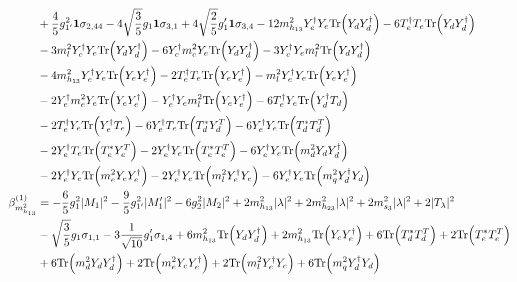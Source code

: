 {\begin{align}
 &+\frac{4}{5} g_{1'}^{2} {\bf 1} \sigma_{2,44} -4 \sqrt{\frac{3}{5}} g_1 {\bf 1} \sigma_{3,1} +4 \sqrt{\frac{2}{5}} g_1' {\bf 1} \sigma_{3,4} -12 m_{h_{13}}^2 {Y_{e}^{\dagger}  Y_e} \mbox{Tr}\Big({Y_d  Y_{d}^{\dagger}}\Big) -6 {T_{e}^{\dagger}  T_e} \mbox{Tr}\Big({Y_d  Y_{d}^{\dagger}}\Big) \nonumber \\ 
 &-3 {m_l^2  Y_{e}^{\dagger}  Y_e} \mbox{Tr}\Big({Y_d  Y_{d}^{\dagger}}\Big) -6 {Y_{e}^{\dagger}  m_e^2  Y_e} \mbox{Tr}\Big({Y_d  Y_{d}^{\dagger}}\Big) -3 {Y_{e}^{\dagger}  Y_e  m_l^2} \mbox{Tr}\Big({Y_d  Y_{d}^{\dagger}}\Big) \nonumber \\ 
 &-4 m_{h_{13}}^2 {Y_{e}^{\dagger}  Y_e} \mbox{Tr}\Big({Y_e  Y_{e}^{\dagger}}\Big) -2 {T_{e}^{\dagger}  T_e} \mbox{Tr}\Big({Y_e  Y_{e}^{\dagger}}\Big) - {m_l^2  Y_{e}^{\dagger}  Y_e} \mbox{Tr}\Big({Y_e  Y_{e}^{\dagger}}\Big) \nonumber \\ 
 &-2 {Y_{e}^{\dagger}  m_e^2  Y_e} \mbox{Tr}\Big({Y_e  Y_{e}^{\dagger}}\Big) - {Y_{e}^{\dagger}  Y_e  m_l^2} \mbox{Tr}\Big({Y_e  Y_{e}^{\dagger}}\Big) -6 {T_{e}^{\dagger}  Y_e} \mbox{Tr}\Big({Y_{d}^{\dagger}  T_d}\Big) \nonumber \\ 
 &-2 {T_{e}^{\dagger}  Y_e} \mbox{Tr}\Big({Y_{e}^{\dagger}  T_e}\Big) -6 {Y_{e}^{\dagger}  T_e} \mbox{Tr}\Big({T_d^*  Y_{d}^{T}}\Big) -6 {Y_{e}^{\dagger}  Y_e} \mbox{Tr}\Big({T_d^*  T_{d}^{T}}\Big) \nonumber \\ 
 &-2 {Y_{e}^{\dagger}  T_e} \mbox{Tr}\Big({T_e^*  Y_{e}^{T}}\Big) -2 {Y_{e}^{\dagger}  Y_e} \mbox{Tr}\Big({T_e^*  T_{e}^{T}}\Big) -6 {Y_{e}^{\dagger}  Y_e} \mbox{Tr}\Big({m_d^2  Y_d  Y_{d}^{\dagger}}\Big) \nonumber \\ 
 &-2 {Y_{e}^{\dagger}  Y_e} \mbox{Tr}\Big({m_e^2  Y_e  Y_{e}^{\dagger}}\Big) -2 {Y_{e}^{\dagger}  Y_e} \mbox{Tr}\Big({m_l^2  Y_{e}^{\dagger}  Y_e}\Big) -6 {Y_{e}^{\dagger}  Y_e} \mbox{Tr}\Big({m_q^2  Y_{d}^{\dagger}  Y_d}\Big) \\ 
\beta_{m_{h_{13}}^2}^{(1)} & =  
-\frac{6}{5} g_{1}^{2} |M_1|^2 -\frac{9}{5} g_{1'}^{2} |M_1'|^2 -6 g_{2}^{2} |M_2|^2 +2 m_{h_{13}}^2 |\lambda|^2 +2 m_{h_{23}}^2 |\lambda|^2 +2 m_{s_3}^2 |\lambda|^2 +2 |T_{\lambda}|^2 \nonumber \\ 
 &- \sqrt{\frac{3}{5}} g_1 \sigma_{1,1} -3 \frac{1}{\sqrt{10}} g_1' \sigma_{1,4} +6 m_{h_{13}}^2 \mbox{Tr}\Big({Y_d  Y_{d}^{\dagger}}\Big) +2 m_{h_{13}}^2 \mbox{Tr}\Big({Y_e  Y_{e}^{\dagger}}\Big) +6 \mbox{Tr}\Big({T_d^*  T_{d}^{T}}\Big) +2 \mbox{Tr}\Big({T_e^*  T_{e}^{T}}\Big) \nonumber \\ 
 &+6 \mbox{Tr}\Big({m_d^2  Y_d  Y_{d}^{\dagger}}\Big) +2 \mbox{Tr}\Big({m_e^2  Y_e  Y_{e}^{\dagger}}\Big) +2 \mbox{Tr}\Big({m_l^2  Y_{e}^{\dagger}  Y_e}\Big) +6 \mbox{Tr}\Big({m_q^2  Y_{d}^{\dagger}  Y_d}\Big) \\ 

\end{align}}
